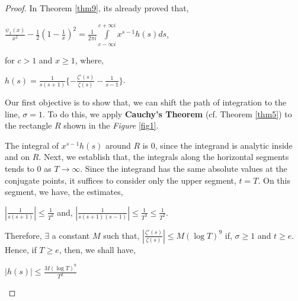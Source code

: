 \documentclass[article,12pt]{elsarticle}
\begin{document}
	\begin{proof}
		In Theorem \eqref{thm9}, its already proved that,
		\begin{center}
			$\frac{\psi_{1}(x)}{x^{2}}-\frac{1}{2}(1-\frac{1}{x})^{2}=\frac{1}{2\pi i}\int\limits_{c-\infty i}^{c+\infty i}x^{s-1}h(s)ds$,
		\end{center}	
		for $c>1$ and $x\geq 1$, where,
		\begin{center}
			$h(s)=\frac{1}{s(s+1)}\{-\frac{\zeta'(s)}{\zeta(s)}-\frac{1}{s-1}\}$.
		\end{center}
		Our first objective is to show that, we can shift the path of integration to the line, $\sigma =1$. To do this, we apply \textbf{Cauchy's Theorem} (cf. Theorem \eqref{thm5}) to the rectangle $R$ shown in the \textit{Figure}  \eqref{fig1}.\par
		\begin{figure}[hbt!]
			\centering
			\caption{}
			\label{fig1}
		\end{figure}
		
		The integral of $x^{s-1}h(s)$ around $R$ is $0$, since the integrand is analytic inside and on $R$. Next, we establish that, the integrals along the horizontal segments tends to $0$ as $T\rightarrow \infty$.
		Since the integrand has the same absolute values at the conjugate points, it suffices to consider only the upper segment, $t=T$. On this segment, we have, the estimates,
		\begin{center}
			$|\frac{1}{s(s+1)}|\leq \frac{1}{T^{2}}$ and,  $|\frac{1}{s(s+1)(s-1)}|\leq \frac{1}{T^{3}}\leq \frac{1}{T^{2}}$.
		\end{center}	
		Therefore, $\exists$ a constant $M$ such that, $|\frac{\zeta'(s)}{\zeta(s)}|\leq M(\log T)^{9}$ if,    $\sigma\geq 1$ and $t\geq e$. Hence, if $T\geq e$, then, we shall have,
		\begin{center}
			$|h(s)|\leq \frac{M(\log T)^{9}}{T^{2}}$
		\end{center}	
		

\end{proof}
\end{document}
